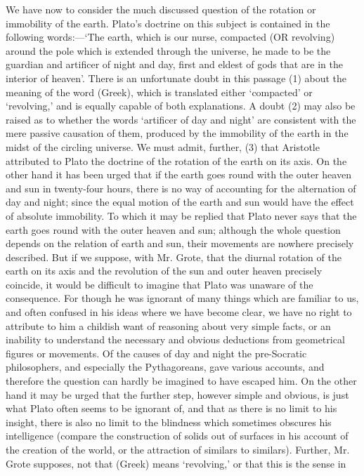 We have now to consider the much discussed question of the rotation or
immobility of the earth. Plato’s doctrine on this subject is contained in
the following words:—‘The earth, which is our nurse, compacted (OR
revolving) around the pole which is extended through the universe, he made
to be the guardian and artificer of night and day, first and eldest of
gods that are in the interior of heaven’. There is an unfortunate doubt in
this passage (1) about the meaning of the word (Greek), which is
translated either ‘compacted’ or ‘revolving,’ and is equally capable of
both explanations. A doubt (2) may also be raised as to whether the words
‘artificer of day and night’ are consistent with the mere passive
causation of them, produced by the immobility of the earth in the midst of
the circling universe. We must admit, further, (3) that Aristotle
attributed to Plato the doctrine of the rotation of the earth on its axis.
On the other hand it has been urged that if the earth goes round with the
outer heaven and sun in twenty-four hours, there is no way of accounting
for the alternation of day and night; since the equal motion of the earth
and sun would have the effect of absolute immobility. To which it may be
replied that Plato never says that the earth goes round with the outer
heaven and sun; although the whole question depends on the relation of
earth and sun, their movements are nowhere precisely described. But if we
suppose, with Mr. Grote, that the diurnal rotation of the earth on its
axis and the revolution of the sun and outer heaven precisely coincide, it
would be difficult to imagine that Plato was unaware of the consequence.
For though he was ignorant of many things which are familiar to us, and
often confused in his ideas where we have become clear, we have no right
to attribute to him a childish want of reasoning about very simple facts,
or an inability to understand the necessary and obvious deductions from
geometrical figures or movements. Of the causes of day and night the
pre-Socratic philosophers, and especially the Pythagoreans, gave various
accounts, and therefore the question can hardly be imagined to have
escaped him. On the other hand it may be urged that the further step,
however simple and obvious, is just what Plato often seems to be ignorant
of, and that as there is no limit to his insight, there is also no limit
to the blindness which sometimes obscures his intelligence (compare the
construction of solids out of surfaces in his account of the creation of
the world, or the attraction of similars to similars). Further, Mr. Grote
supposes, not that (Greek) means ‘revolving,’ or that this is the sense in
